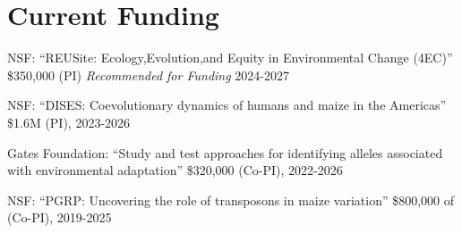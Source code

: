 \documentclass[letterpaper,10pt]{article}
\renewenvironment{itemize}{
  \begin{list}{}{
    \setlength{\leftmargin}{1.5em}
  }
}{
  \end{list}
}
\begin{document}
\section*{Current Funding}
\begin{itemize}
\item NSF: ``REUSite: Ecology,Evolution,and Equity in Environmental Change (4EC)'' \$350,000 (PI) \textit{Recommended for Funding} 2024-2027
\item NSF: ``DISES: Coevolutionary dynamics of humans and maize in the Americas'' \$1.6M (PI), 2023-2026
\item Gates Foundation: ``Study and test approaches for identifying alleles associated with environmental adaptation'' \$320,000 (Co-PI), 2022-2026
\item NSF: ``PGRP: Uncovering the role of transposons in maize variation'' \$800,000 of (Co-PI), 2019-2025%

\end{itemize}
\end{document}

